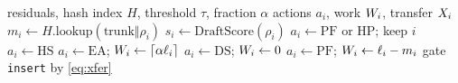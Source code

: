 \begin{algorithm}[t]
\caption{PrefillPlan($\{\rho_i\}$, $H$, $\tau$, $\alpha$, winner)}
\label{alg:app}
\small
\begin{algorithmic}[1]
\REQUIRE residuals, hash index $H$, threshold $\tau$, fraction $\alpha$
\ENSURE actions $a_i$, work $W_i$, transfer $X_i$
  \STATE $m_i\leftarrow H.\mathrm{lookup}(\mathrm{trunk}\Vert\rho_i)$ 
  \STATE $s_i\leftarrow\mathrm{DraftScore}(\rho_i)$
    \STATE $a_i\leftarrow\mathrm{PF}$ or $\mathrm{HP}$; keep $i$
    \STATE $a_i\leftarrow\mathrm{HS}$
    \STATE $a_i\leftarrow\mathrm{EA}$; $W_i\leftarrow\lceil\alpha\ell_i\rceil$
    \STATE $a_i\leftarrow\mathrm{DS}$; $W_i\leftarrow 0$
  \ELSE
    \STATE $a_i\leftarrow\mathrm{PF}$; $W_i\leftarrow\ell_i-m_i$
  \ENDIF
  \STATE gate \texttt{insert} by \eqref{eq:xfer}
\ENDFOR
\end{algorithmic}
\end{algorithm}

